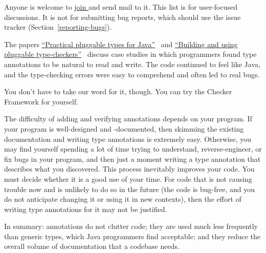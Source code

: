 Anyone is welcome to
\href{https://groups.google.com/forum/#!forum/checker-framework-discuss}{join
  } and send mail to it.
This list is for user-focused discussions.  It is not for submitting bug reports,
which should use the issue tracker (Section~\ref{reporting-bugs}).





The papers
\href{https://homes.cs.washington.edu/~mernst/pubs/pluggable-checkers-issta2008-abstract.html}{``Practical
  pluggable types for Java''}~\cite{PapiACPE2008}
and
\href{https://homes.cs.washington.edu/~mernst/pubs/pluggable-checkers-icse2011-abstract.html}{``Building
  and using pluggable type-checkers''}~\cite{DietlDEMS2011}
discuss case studies in
which programmers
found type annotations to be natural to read and write.  The code
continued to feel like Java, and the type-checking errors were easy to
comprehend and often led to real bugs.

You don't have to take our word for it, though.  You can try the
Checker Framework for yourself.

The difficulty of adding and verifying annotations depends on your program.
If your program is well-designed and -documented, then skimming the
existing documentation and writing type annotations is extremely easy.
Otherwise, you may find yourself spending a lot of time trying to
understand, reverse-engineer, or fix bugs in your program, and then just a
moment writing a type annotation that describes what you discovered.  This
process inevitably improves your code.  You must decide whether it is a
good use of your time.  For code that is not causing trouble now and is
unlikely to do so in the future (the code is bug-free, and you do not
anticipate changing it or using it in new contexts), then the
effort of writing type annotations for it may not be justified.




In summary:  annotations do not clutter code; they are used much
less frequently than generic types, which Java programmers find acceptable;
and they reduce the overall volume of documentation that a codebase needs.

